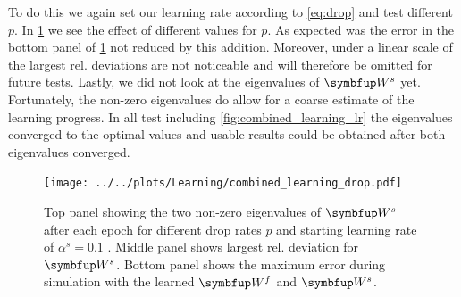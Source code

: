 To do this we again set our learning rate according to \cref{eq:drop} and test different $p$. In \cref{fig:combined_learning_dr} we see the effect of different values for $p$. As expected was the error in the bottom panel of \cref{fig:combined_learning_dr} not reduced by this addition. Moreover, under a linear scale of the largest rel. deviations are not noticeable and will therefore be omitted for future tests. Lastly, we did not look at the eigenvalues of $\bmu{W}^s$ yet. Fortunately, the non-zero eigenvalues do allow for a coarse estimate of the learning progress. In all test including \cref{fig:combined_learning_lr} the eigenvalues converged to the optimal values and usable results could be obtained after both eigenvalues converged.\\
\begin{figure}
	\centering
	\texttt{[image: ../../plots/Learning/combined\_learning\_drop.pdf]}
	\caption{Top panel showing the two non-zero eigenvalues  of $\bmu{W}^s$ after each epoch for different drop rates $p$ and starting learning rate of $\alpha^s = 0.1$ . Middle panel shows largest rel. deviation for $\bmu{W}^s$. Bottom panel shows the maximum error during simulation with the learned $\bmu{W}^f$ and $\bmu{W}^s$.}
\label{fig:combined_learning_dr}
\end{figure}


